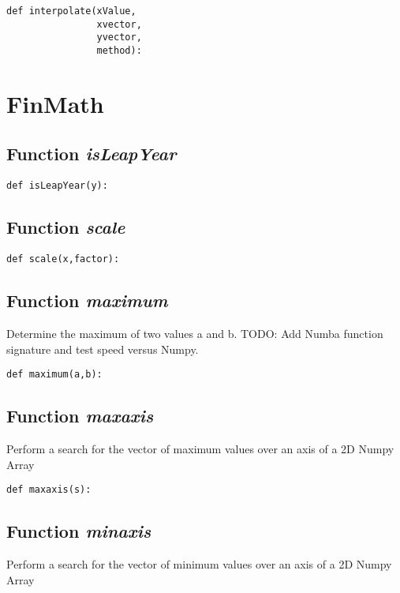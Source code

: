 \documentclass[twoside,11pt]{book}
\begin{document}
\begin{lstlisting}
def interpolate(xValue,
                xvector,
                yvector,
                method):
\end{lstlisting}

\newpage
\section{FinMath}

\subsection{Function {\it isLeapYear}}


\begin{lstlisting}
def isLeapYear(y):
\end{lstlisting}

\subsection{Function {\it scale}}


\begin{lstlisting}
def scale(x,factor):
\end{lstlisting}

\subsection{Function {\it maximum}}
Determine the maximum of two values a and b. TODO: Add Numba function signature and test speed versus Numpy. 

\begin{lstlisting}
def maximum(a,b):
\end{lstlisting}

\subsection{Function {\it maxaxis}}
Perform a search for the vector of maximum values over an axis of a 2D Numpy Array 

\begin{lstlisting}
def maxaxis(s):
\end{lstlisting}

\subsection{Function {\it minaxis}}
Perform a search for the vector of minimum values over an axis of a 2D Numpy Array 
\end{document}
